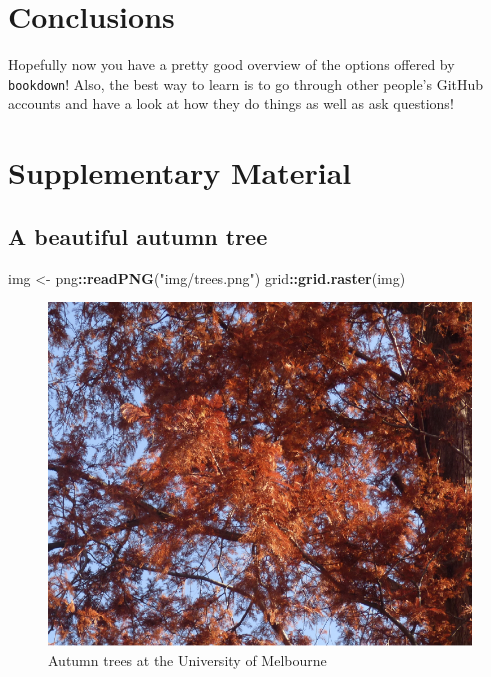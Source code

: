 \documentclass[12pt,]{article}
\newenvironment{Shaded}{\begin{snugshade}}{\end{snugshade}}
\newcommand{\KeywordTok}[1]{\textcolor[rgb]{0.13,0.29,0.53}{\textbf{#1}}}
\newcommand{\StringTok}[1]{\textcolor[rgb]{0.31,0.60,0.02}{#1}}
\newcommand{\OperatorTok}[1]{\textcolor[rgb]{0.81,0.36,0.00}{\textbf{#1}}}
\newcommand{\NormalTok}[1]{#1}
\begin{document}
\section{Conclusions}\label{conclusions}

Hopefully now you have a pretty good overview of the options offered by
\texttt{bookdown}! Also, the best way to learn is to go through other
people's GitHub accounts and have a look at how they do things as well
as ask questions!

\newpage

\section*{Supplementary Material}\label{supplementary-material}

\beginsupplement

\subsection*{A beautiful autumn tree}\label{a-beautiful-autumn-tree}

\begin{Shaded}
\begin{Highlighting}[]
\NormalTok{img <-}\StringTok{ }\NormalTok{png}\OperatorTok{::}\KeywordTok{readPNG}\NormalTok{(}\StringTok{"img/trees.png"}\NormalTok{)}
\NormalTok{grid}\OperatorTok{::}\KeywordTok{grid.raster}\NormalTok{(img)}
\end{Highlighting}
\end{Shaded}

\begin{figure}
\centering
\includegraphics{img/red-trees-1.pdf}
\caption{\label{fig:red-trees}Autumn trees at the University of Melbourne}
\end{figure}
\end{document}
